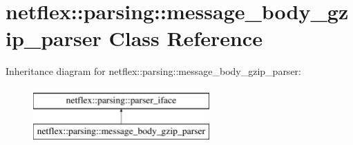 \hypertarget{classnetflex_1_1parsing_1_1message__body__gzip__parser}{}\section{netflex\+:\+:parsing\+:\+:message\+\_\+body\+\_\+gzip\+\_\+parser Class Reference}
\label{classnetflex_1_1parsing_1_1message__body__gzip__parser}
Inheritance diagram for netflex\+:\+:parsing\+:\+:message\+\_\+body\+\_\+gzip\+\_\+parser\+:\begin{figure}[H]
\begin{center}
\leavevmode
\includegraphics[height=2.000000cm]{classnetflex_1_1parsing_1_1message__body__gzip__parser}
\end{center}
\end{figure}
